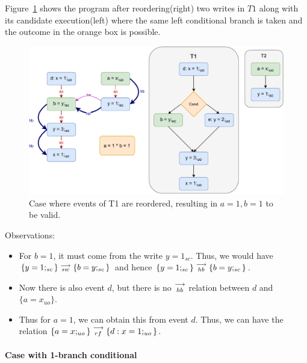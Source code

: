     Figure~\ref{reord:cond_counter_example1(b)} shows the program after reordering(right) two writes in $T1$ along with its candidate execution(left) where the same left conditional branch is taken and the outcome in the orange box is possible. 
    \begin{figure}[H]
        \centering 
        \includegraphics[scale=0.7]{7.CounterExamples/ReorderingConditionals/CounterExamples1b(Conditionals).pdf}
        \caption{Case where events of T1 are reordered, resulting in $a = 1,  b = 1$ to be valid.}
        \label{reord:cond_counter_example1(b)}
    \end{figure}
    
    Observations:
    \begin{itemize}
        \item For $b=1$, it must come from the write $y=1_{sc}$. 
        Thus, we would have $\{y=1;_{sc}\}\stackrel{\longrightarrow}{_{sw}}\{b=y;_{sc}\}$ and hence $\{y=1;_{sc}\}\stackrel{\longrightarrow}{_{hb}}\{b=y;_{sc}\}$.
        \item Now there is also event $d$, but there is no $\stackrel{\longrightarrow}{_{hb}}$ relation between $d$ and $\{a=x_{uo}\}$.
        \item Thus for $a=1$, we can obtain this from event $d$. Thus, we can have the relation $\{a=x;_{uo}\}\stackrel{\longrightarrow}{_{rf}}\{d: x=1;_{uo}\}$.
    \end{itemize}
    
    \paragraph{Case with 1-branch conditional}


